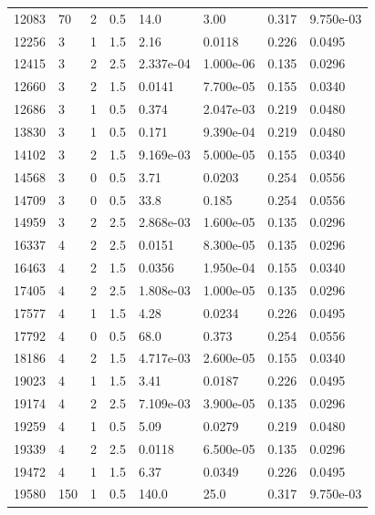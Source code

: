 \documentclass[preview]{standalone}
\begin{document}
{{\begin{tabular}{L{1.2cm}C{1.2cm} C{0.3cm}C{0.5cm} C{1.4cm}C{1.4cm} C{1.4cm}C{1.4cm}}
  12083  &    70  & 2     & 0.5 &  14.0  & 3.00  & 0.317 &  9.750e-03   \\ 
  12256  &     3  & 1     & 1.5 &  2.16  & 0.0118  & 0.226 &  0.0495   \\ 
  12415  &     3  & 2     & 2.5 &  2.337e-04  & 1.000e-06  & 0.135 &  0.0296   \\ 
  12660  &     3  & 2     & 1.5 &  0.0141  & 7.700e-05  & 0.155 &  0.0340   \\ 
  12686  &     3  & 1     & 0.5 &  0.374  & 2.047e-03  & 0.219 &  0.0480   \\ 
  13830  &     3  & 1     & 0.5 &  0.171  & 9.390e-04  & 0.219 &  0.0480   \\ 
  14102  &     3  & 2     & 1.5 &  9.169e-03  & 5.000e-05  & 0.155 &  0.0340   \\ 
  14568  &     3  & 0     & 0.5 &  3.71  & 0.0203  & 0.254 &  0.0556   \\ 
  14709  &     3  & 0     & 0.5 &  33.8  & 0.185  & 0.254 &  0.0556   \\ 
  14959  &     3  & 2     & 2.5 &  2.868e-03  & 1.600e-05  & 0.135 &  0.0296   \\ 
  16337  &     4  & 2     & 2.5 &  0.0151  & 8.300e-05  & 0.135 &  0.0296   \\ 
  16463  &     4  & 2     & 1.5 &  0.0356  & 1.950e-04  & 0.155 &  0.0340   \\ 
  17405  &     4  & 2     & 2.5 &  1.808e-03  & 1.000e-05  & 0.135 &  0.0296   \\ 
  17577  &     4  & 1     & 1.5 &  4.28  & 0.0234  & 0.226 &  0.0495   \\ 
  17792  &     4  & 0     & 0.5 &  68.0  & 0.373  & 0.254 &  0.0556   \\ 
  18186  &     4  & 2     & 1.5 &  4.717e-03  & 2.600e-05  & 0.155 &  0.0340   \\ 
  19023  &     4  & 1     & 1.5 &  3.41  & 0.0187  & 0.226 &  0.0495   \\ 
  19174  &     4  & 2     & 2.5 &  7.109e-03  & 3.900e-05  & 0.135 &  0.0296   \\ 
  19259  &     4  & 1     & 0.5 &  5.09  & 0.0279  & 0.219 &  0.0480   \\ 
  19339  &     4  & 2     & 2.5 &  0.0118  & 6.500e-05  & 0.135 &  0.0296   \\ 
  19472  &     4  & 1     & 1.5 &  6.37  & 0.0349  & 0.226 &  0.0495   \\ 
  19580  &   150  & 1     & 0.5 &  140.0  & 25.0  & 0.317 &  9.750e-03   \\ 

\end{tabular}}}
\end{document}
